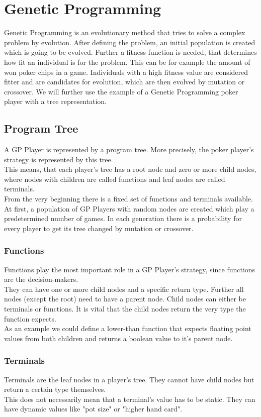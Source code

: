 \documentclass[12pt,fleqn,a4paper]{article}
\begin{document}
\newpage
\section{Genetic Programming}
\label{sec:genprog}
Genetic Programming is an evolutionary method that tries to solve a complex problem by evolution.
After defining the problem, an initial population is created which is going to be evolved.
Further a fitness function is needed, that determines how fit an individual is for the problem.
This can be for example the amount of won poker chips in a game.
Individuals with a high fitness value are considered fitter and are candidates for evolution, which are then evolved by mutation or crossover.
We will further use the example of a Genetic Programming poker player with a tree representation.

\subsection{Program Tree}
A GP Player is represented by a program tree. More precisely, the poker player's strategy is represented by this tree.\\
This means, that each player's tree has a root node and zero or more child nodes, where nodes with children are called functions and leaf nodes are called terminals.\\
From the very beginning there is a fixed set of functions and terminals available.
At first, a population of GP Players with random nodes are created which play a predetermined number of games.
In each generation there is a probability for every player to get its tree changed by mutation or crossover.

\subsubsection{Functions}
Functions play the most important role in a GP Player's strategy, since functions are the decision-makers.\\
They can have one or more child nodes and a specific return type. Further all nodes (except the root)  need to have a parent node.
Child nodes can either be terminals or functions. It is vital that the child nodes return the very type the function expects.\\
As an example we could define a lower-than function that expects floating point values from both children and returns a boolean value to it's parent node.

\subsubsection{Terminals}
Terminals are the leaf nodes in a player's tree. They cannot have child nodes but return a certain type themselves.\\
This does not necessarily mean that a terminal's value has to be static. They can have dynamic values like "pot size" or "higher hand card".
\end{document}
